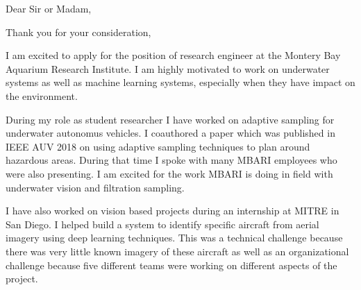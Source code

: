 \documentclass[11pt,a4paper,sans]{moderncv}        %
\begin{document}
\date{January 29, 2019}
\opening{Dear Sir or Madam,}
\closing{Thank you for your consideration,}
\makelettertitle

I am excited to apply for the position of research engineer at the Montery Bay Aquarium Research Institute. I am highly motivated to work on underwater systems as well as machine learning systems, especially when they have impact on the environment. 

During my role as student researcher I have worked on adaptive sampling for underwater autonomus vehicles. I coauthored a paper which was published in IEEE AUV 2018 on using adaptive sampling techniques to plan around hazardous areas. During that time I spoke with many MBARI employees who were also presenting. I am excited for the work MBARI is doing in field with underwater vision and filtration sampling. 

I have also worked on vision based projects during an internship at MITRE in San Diego. I helped build a system to identify specific aircraft from aerial imagery using deep learning techniques. This was a technical challenge because there was very little known imagery of these aircraft as well as an organizational challenge because five different teams were working on different aspects of the project. 


\makeletterclosing
\end{document}
